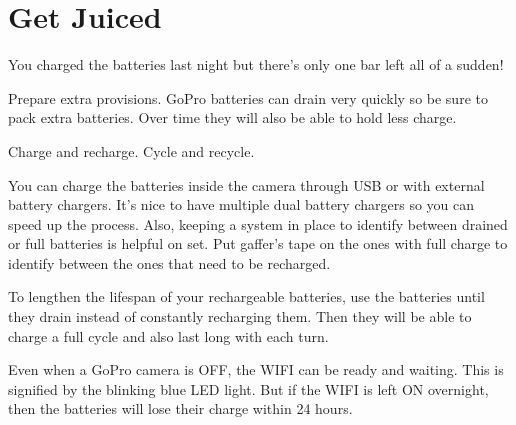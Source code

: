 \chapter{Get Juiced}
\pagecolor{white}
\label{chap:7}
\begin{fullwidth}


\problem

{\large You charged the batteries last night but there’s only one bar left all of a sudden! \par}

Prepare extra provisions. GoPro batteries can drain very quickly so be sure to pack extra batteries. Over time they will also be able to hold less charge. 


\solution

{\large Charge and recharge. Cycle and recycle. \par}

You can charge the batteries inside the camera through USB or with external battery chargers. It’s nice to have multiple dual battery chargers so you can speed up the process. Also, keeping a system in place to identify between drained or full batteries is helpful on set. Put gaffer’s tape on the ones with full charge to identify between the ones that need to be recharged. 

To lengthen the lifespan of your rechargeable batteries, use the batteries until they drain instead of constantly recharging them. Then they will be able to charge a full cycle and also last long with each turn. 

\tip Even when a GoPro camera is OFF, the WIFI can be ready and waiting. This is signified by the blinking blue LED light. But if the WIFI is left ON overnight, then the batteries will lose their charge within 24 hours.




\clearpage
\end{fullwidth}

